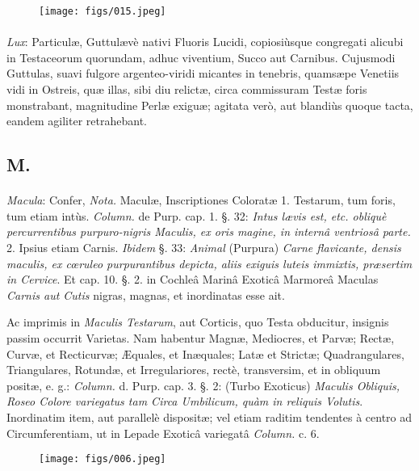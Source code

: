 \documentclass[a4paper, 11pt, oneside, polutonikogreek, german]{article}
\begin{document}
\begin{figure}[H]
\centering
\texttt{[image: figs/015.jpeg]}
\end{figure}
\paragraph{}
\emph{Lux}: Particulæ, Guttulævè nativi Fluoris Lucidi, copiosiùsque congregati alicubi in Testaceorum quorundam, adhuc viventium, Succo aut Carnibus. Cujusmodi Guttulas, suavi fulgore argenteo-viridi micantes in tenebris, quamsæpe Venetiis vidi in Ostreis, quæ illas, sibi diu relictæ, circa commissuram Testæ foris monstrabant, magnitudine Perlæ exiguæ; agitata verò, aut blandiùs quoque tacta, eandem agiliter retrahebant.

\subsection{M.}
\paragraph{}
\emph{Macula}: Confer, \emph{Nota.} Maculæ, Inscriptiones Coloratæ 1. Testarum, tum foris, tum etiam intùs. \emph{Column.} de Purp. cap. 1. §. 32: \emph{Intus lævis est, etc. obliquè percurrentibus purpuro-nigris Maculis, ex oris magine, in internâ ventriosâ parte.} 2. Ipsius etiam Carnis. \emph{Ibidem} §. 33: \emph{Animal} (Purpura) \emph{Carne flavicante, densis maculis, ex cœruleo purpurantibus depicta, aliis exiguis luteis immixtis, præsertim in Cervice}. Et cap. 10. §. 2. in Cochleâ Marinâ Exoticâ Marmoreâ Maculas \emph{Carnis aut Cutis} nigras, magnas, et inordinatas esse ait.

Ac imprimis in \emph{Maculis Testarum}, aut Corticis, quo Testa obducitur, insignis passim occurrit Varietas. Nam habentur Magnæ, Mediocres, et Parvæ; Rectæ, Curvæ, et Recticurvæ; Æquales, et Inæquales; Latæ et Strictæ; Quadrangulares, Triangulares, Rotundæ, et Irregulariores, rectè, transversim, et in obliquum positæ, e. g.: \emph{Column.} d. Purp. cap. 3. §. 2: (Turbo Exoticus) \emph{Maculis Obliquis, Roseo Colore variegatus tam Circa Umbilicum, quàm in reliquis Volutis}. Inordinatim item, aut parallelè dispositæ; vel etiam raditim tendentes à centro ad Circumferentiam, ut in Lepade Exoticâ variegatâ \emph{Column.} c. 6.

\begin{figure}[H]
\centering
\texttt{[image: figs/006.jpeg]}
\end{figure}
\end{document}

